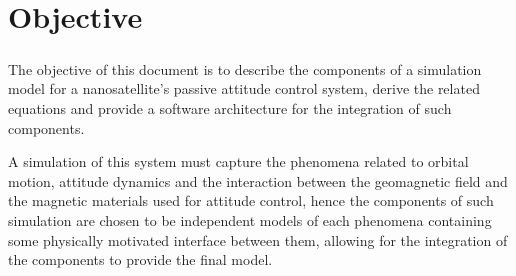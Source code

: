 %
%
%
%
%

%
%
%
%
%
%

\chapter{Objective} \label{ch:objective}

\paragraph{}
\indent 
The objective of this document is to describe the components of a simulation model for a nanosatellite's passive attitude control system, derive the related equations and provide a software architecture for the integration of such components. 

\indent 
A simulation of this system must capture the phenomena related to orbital motion, attitude dynamics and the interaction between the geomagnetic field and the magnetic materials used for attitude control, hence the components of such simulation are chosen to be independent models of each phenomena containing some physically motivated interface between them, allowing for the integration of the components to provide the final model.

